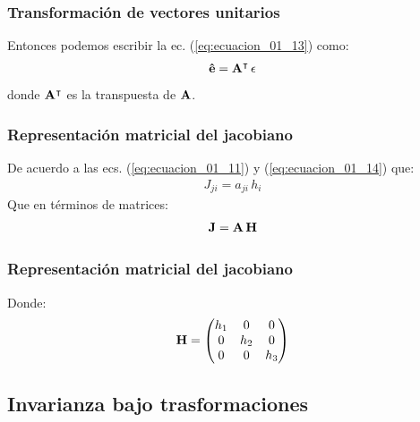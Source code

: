 \documentclass[12pt]{beamer}
\begin{document}
\begin{frame}
\frametitle{Transformación de vectores unitarios}
Entonces podemos escribir la ec. (\ref{eq:ecuacion_01_13}) como:
\pause
\begin{align}
\vu{e} = \vb{A}^{\intercal} \, \epsilon
\end{align}
donde $\vb{A}^{\intercal}$ es la transpuesta de $\vb{A}$.
\end{frame}
\begin{frame}
\frametitle{Representación matricial del jacobiano}
De acuerdo a las ecs. (\ref{eq:ecuacion_01_11}) y (\ref{eq:ecuacion_01_14}) que:
\pause
\begin{align*}
J_{ji} = a_{ji} \, h_{i}
\end{align*}
\pause
Que en términos de matrices:
\begin{align}
\vb{J} = \vb{A} \, \vb{H}
\label{eq:ecuacion_01_16}
\end{align}
\end{frame}
\begin{frame}
\frametitle{Representación matricial del jacobiano}
Donde:
\pause
\begin{align}
\vb{H} = \begin{pmatrix}
h_{1} & 0 & 0 \\
0 & h_{2} & 0 \\
0 & 0 & h_{3} \\
\end{pmatrix}
\label{eq:ecuacion_01_17}
\end{align}
\end{frame}

\subsection*{Invarianza bajo trasformaciones}
\end{document}
